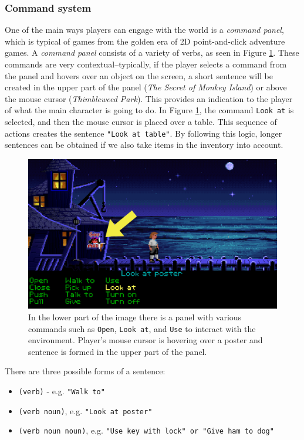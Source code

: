 \subsubsection{Command system}
One of the main ways players can engage with the world is a \textit{command panel}, which is typical of games from the golden era of 2D point-and-click adventure games. A \textit{command panel} consists of a variety of verbs, as seen in Figure \ref{fig:C-TSoMI}. These commands are very contextual--typically, if the player selects a command from the panel and hovers over an object on the screen, a short sentence will be created in the upper part of the panel (\textit{The Secret of Monkey Island}) or above the mouse cursor (\textit{Thimbleweed Park}). This provides an indication to the player of what the main character is going to do. In Figure \ref{fig:C-TSoMI}, the command \texttt{Look at} is selected, and then the mouse cursor is placed over a table. This sequence of actions creates the sentence \texttt{"Look at table"}. By following this logic, longer sentences can be obtained if we also take items in the inventory into account.

\begin{figure}[H]
\centering
\includegraphics[width=.8\linewidth]{img/C-TSoMI.png}
\caption{In the lower part of the image there is a panel with various commands such as \texttt{Open}, \texttt{Look at}, and \texttt{Use} to interact with the environment. Player's mouse cursor is hovering over a poster and sentence is formed in the upper part of the panel.}
\label{fig:C-TSoMI}
\end{figure}

There are three possible forms of a sentence:
\begin{itemize}
    \item \verb|(verb)| - e.g. \texttt{"Walk to"}
    \item \verb|(verb noun)|, e.g. \texttt{"Look at poster"}
    \item \verb|(verb noun noun)|, e.g. \texttt{\texttt{"Use key with lock"} or "Give ham to dog"}
\end{itemize}
 
